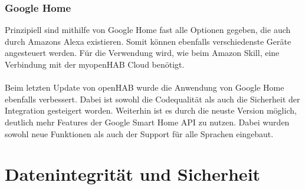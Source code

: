 \subsubsection{Google Home}

Prinzipiell sind mithilfe von Google Home fast alle Optionen gegeben, die auch durch Amazons Alexa existieren. Somit können ebenfalls verschiedenste Geräte angesteuert werden. Für die Verwendung wird, wie beim Amazon Skill, eine Verbindung mit der myopenHAB Cloud benötigt.\\
\\
Beim letzten Update von openHAB wurde die Anwendung von Google Home ebenfalls verbessert. Dabei ist sowohl die Codequalität als auch die Sicherheit der Integration gesteigert worden. Weiterhin ist es durch die neuste Version möglich, deutlich mehr Features der Google Smart Home API zu nutzen. Dabei wurden sowohl neue Funktionen als auch der Support für alle Sprachen eingebaut.\cite{openHAB02:OH}\cite{GOOGLEH01:GH}

\section{Datenintegrität und Sicherheit}

